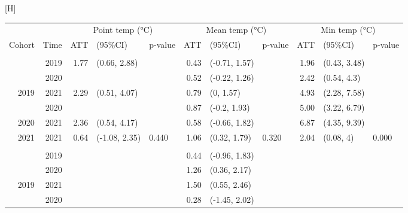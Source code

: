 \documentclass[
  letterpaper,
  DIV=11,
  numbers=noendperiod]{scrartcl}
\makeatletter
\renewenvironment{table}%
   {\renewcommand\familydefault\sfdefault
    \@float{table}}
   {\end@float}
\makeatother
\begin{document}
\hypertarget{tbl-a-het-temp}{}
\begin{table}[H]
\caption{\label{tbl-a-het-temp}Heterogenous treatment effects: Indoor temperature }\tabularnewline

\centering\begingroup\fontsize{9}{11}\selectfont

\begin{tabular}{rrrllrllrll}
\toprule
\multicolumn{2}{c}{ } & \multicolumn{3}{c}{Point temp (°C)} & \multicolumn{3}{c}{Mean temp (°C)} & \multicolumn{3}{c}{Min temp (°C)} \\
\cmidrule(l{3pt}r{3pt}){3-5} \cmidrule(l{3pt}r{3pt}){6-8} \cmidrule(l{3pt}r{3pt}){9-11}
Cohort & Time & ATT & (95\%CI) & p-value & ATT & (95\%CI) & p-value & ATT & (95\%CI) & p-value\\
\midrule
\addlinespace[0.3em]
\multicolumn{11}{l}{\textbf{All times}}\\
 & 2019 & 1.77 & (0.66, 2.88) &  & 0.43 & (-0.71, 1.57) &  & 1.96 & (0.43, 3.48) & \\
\cmidrule{2-11}
 & 2020 &  &  &  & 0.52 & (-0.22, 1.26) &  & 2.42 & (0.54, 4.3) & \\
\cmidrule{2-11}
\multirow[t]{-3}{*}{\raggedleft\arraybackslash \hspace{1em}2019} & 2021 & 2.29 & (0.51, 4.07) &  & 0.79 & (0, 1.57) &  & 4.93 & (2.28, 7.58) & \\
\cmidrule{1-11}
 & 2020 &  &  &  & 0.87 & (-0.2, 1.93) &  & 5.00 & (3.22, 6.79) & \\
\cmidrule{2-11}
\multirow[t]{-2}{*}{\raggedleft\arraybackslash \hspace{1em}2020} & 2021 & 2.36 & (0.54, 4.17) &  & 0.58 & (-0.66, 1.82) &  & 6.87 & (4.35, 9.39) & \\
\cmidrule{1-11}
\hspace{1em}2021 & 2021 & 0.64 & (-1.08, 2.35) & 0.440 & 1.06 & (0.32, 1.79) & 0.320 & 2.04 & (0.08, 4) & 0.000\\
\cmidrule{1-11}
\addlinespace[0.3em]
\multicolumn{11}{l}{\textbf{Daytime}}\\
 & 2019 &  &  &  & 0.44 & (-0.96, 1.83) &  &  &  & \\
\cmidrule{2-11}
 & 2020 &  &  &  & 1.26 & (0.36, 2.17) &  &  &  & \\
\cmidrule{2-11}
\multirow[t]{-3}{*}{\raggedleft\arraybackslash \hspace{1em}2019} & 2021 &  &  &  & 1.50 & (0.55, 2.46) &  &  &  & \\
\cmidrule{1-11}
 & 2020 &  &  &  & 0.28 & (-1.45, 2.02) &  &  &  & \\

\end{tabular}
\end{table}
\end{document}
